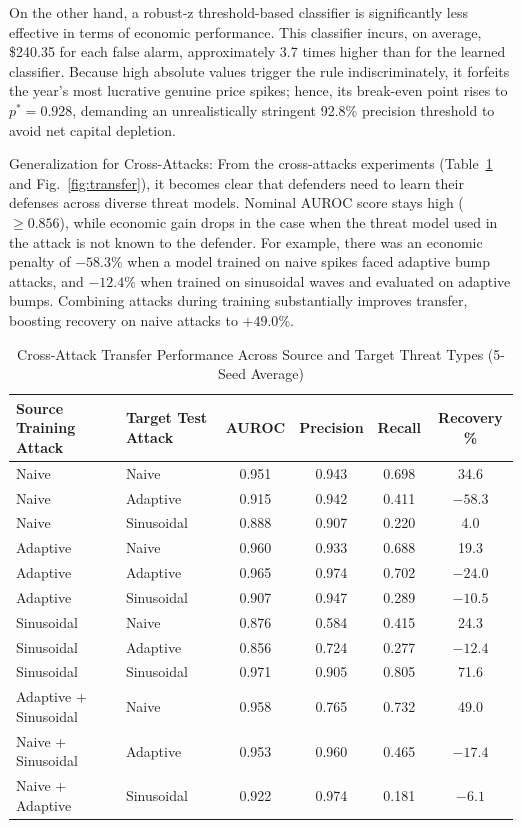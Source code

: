 \documentclass[journal]{IEEEtran}
\begin{document}
On the other hand, a robust-z threshold-based classifier is significantly less effective in terms of economic performance. This classifier incurs, on average, \$240.35 for each false alarm, approximately 3.7 times higher than for the learned classifier. Because high absolute values trigger the rule indiscriminately, it forfeits the year's most lucrative genuine price spikes; hence, its break-even point rises to $p^* = 0.928$, demanding an unrealistically stringent 92.8\% precision threshold to avoid net capital depletion.

Generalization for Cross-Attacks: From the cross-attacks experiments (Table~\ref{tab:transfer} and Fig.~\ref{fig:transfer}), it becomes clear that defenders need to learn their defenses across diverse threat models. Nominal AUROC score stays high ($\geq 0.856$), while economic gain drops in the case when the threat model used in the attack is not known to the defender. For example, there was an economic penalty of $-58.3\%$ when a model trained on naive spikes faced adaptive bump attacks, and $-12.4\%$ when trained on sinusoidal waves and evaluated on adaptive bumps. Combining attacks during training substantially improves transfer, boosting recovery on naive attacks to $+49.0\%$.

\begin{table}[!t]
    \centering
    \caption{Cross-Attack Transfer Performance Across Source and Target Threat Types (5-Seed Average)}
    \label{tab:transfer}
    \footnotesize
    \renewcommand{\arraystretch}{1.15}
    \setlength{\tabcolsep}{8pt}
    \begin{tabular}{llcccc}
    \toprule
    \textbf{Source Training Attack} & \textbf{Target Test Attack} & \textbf{AUROC} & \textbf{Precision} & \textbf{Recall} & \textbf{Recovery \%} \\
    \midrule
    Naive & Naive & 0.951 & 0.943 & 0.698 & 34.6 \\
    Naive & Adaptive & 0.915 & 0.942 & 0.411 & $-58.3$ \\
    Naive & Sinusoidal & 0.888 & 0.907 & 0.220 & 4.0 \\
    Adaptive & Naive & 0.960 & 0.933 & 0.688 & 19.3 \\
    Adaptive & Adaptive & 0.965 & 0.974 & 0.702 & $-24.0$ \\
    Adaptive & Sinusoidal & 0.907 & 0.947 & 0.289 & $-10.5$ \\
    Sinusoidal & Naive & 0.876 & 0.584 & 0.415 & 24.3 \\
    Sinusoidal & Adaptive & 0.856 & 0.724 & 0.277 & $-12.4$ \\
    Sinusoidal & Sinusoidal & 0.971 & 0.905 & 0.805 & 71.6 \\
    \midrule
    Adaptive + Sinusoidal & Naive & 0.958 & 0.765 & 0.732 & 49.0 \\
    Naive + Sinusoidal & Adaptive & 0.953 & 0.960 & 0.465 & $-17.4$ \\
    Naive + Adaptive & Sinusoidal & 0.922 & 0.974 & 0.181 & $-6.1$ \\
    \bottomrule
    \end{tabular}
    \end{table}
\end{document}
